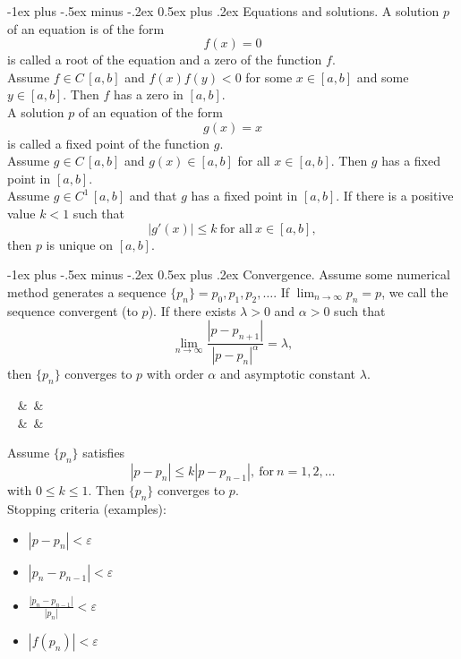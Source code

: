 \documentclass[10pt,landscape,a4paper]{article}
\makeatletter
\renewcommand{\section}{\@startsection{section}{1}{0mm}%
	{-1ex plus -.5ex minus -.2ex}%
	{0.5ex plus .2ex}%
	{\normalfont\large\bfseries}}
\makeatother
\begin{document}
\begin{multicols}{3}
		\section{Equations and solutions.}
		A solution $ p $ of an equation is of the form
		\[
			f(x)=0
		\]
		is called a root of the equation and a zero of the function $ f $.\\
		Assume $ f\in C\,[a,b] $ and $ f(x)f(y)<0 $ for some $ x\in[a,b] $ and some $ y\in[a,b] $. Then $ f $ has a zero in $ [a,b] $.\\
		A solution $ p $ of an equation of the form
		\[
			g(x)=x
		\]
		is called a fixed point of the function $ g $.\\
		Assume $ g\in C\,[a,b] $ and $ g(x)\in[a,b] $ for all $ x\in[a,b] $. Then $ g $ has a fixed point in $ [a,b] $.\\
		Assume $ g\in C^1\,[a,b] $ and that $ g $ has a fixed point in $ [a,b] $. If there is a positive value $ k<1 $ such that
		\[
			|g'(x)|\leq k \ \text{for all} \ x\in[a,b],
		\]
		then $ p $ is unique on $ [a,b] $.
		
		\section{Convergence.}
		Assume some numerical method generates a sequence $ \{p_n\}=p_0,p_1,p_2,\hdots $.
		If $ \lim_{n\rightarrow\infty}{p_n}=p $, we call the sequence convergent (to $ p $).
		If there exists $ \lambda>0 $ and $ \alpha>0 $ such that
		\[
			\lim_{n\rightarrow\infty}\frac{|p-p_{n+1}|}{|p-p_n|^\alpha}=\lambda,
		\]
		then $ \{p_n\} $ converges to $ p $ with order $ \alpha $ and asymptotic constant $ \lambda $.
			\begin{flalign*}
				 \  &\ &\\
				 \  &\ &
			\end{flalign*}
		Assume $ \{p_n\} $ satisfies
		\[
			|p-p_n|\leq k|p-p_{n-1}|, \ \text{for} \ n=1,2,\hdots
		\]
		with $ 0\leq k\leq1 $. Then $ \{p_n\} $ converges to $ p $.\\
		Stopping criteria (examples):
			\begin{itemize}
				\item $ |p-p_n|<\varepsilon $
				\item $ |p_n-p_{n-1}|<\varepsilon $
				\item $ \frac{|p_n-p_{n-1}|}{|p_n|}<\varepsilon $
				\item $ |f(p_n)|<\varepsilon $
			\end{itemize}
		

\end{multicols}
\end{document}
